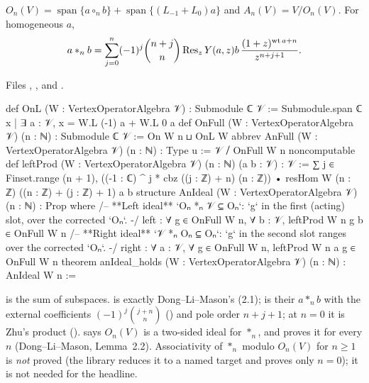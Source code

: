 \begin{definition}\label{l13:def:onfull}
$O_n(V) = \operatorname{span}\{a\circ_nb\} + \operatorname{span}\{(L_{-1}+L_0)a\}$ and $A_n(V) = V/O_n(V)$. For homogeneous $a$,
\begin{equation*}
 a*_nb = \sum_{j=0}^n(-1)^j\binom{n+j}{n}\operatorname{Res}_zY(a,z)b\,\frac{(1+z)^{\operatorname{wt} a+n}}{z^{n+j+1}}.
\end{equation*}
\end{definition}
\noindent Files ,
,
 and
.
\begin{leancode}
def OnL (W : VertexOperatorAlgebra 𝒱) : Submodule ℂ 𝒱 :=
  Submodule.span ℂ {x | ∃ a : 𝒱, x = W.L (-1) a + W.L 0 a}
def OnFull (W : VertexOperatorAlgebra 𝒱) (n : ℕ) : Submodule ℂ 𝒱 :=
  On W n ⊔ OnL W
abbrev AnFull (W : VertexOperatorAlgebra 𝒱) (n : ℕ) : Type u := 𝒱 ⧸ OnFull W n
noncomputable def leftProd (W : VertexOperatorAlgebra 𝒱) (n : ℕ) (a b : 𝒱) : 𝒱 :=
  ∑ j ∈ Finset.range (n + 1),
    ((-1 : ℂ) ^ j * cbz ((j : ℤ) + n) (n : ℤ)) •
      resHom W (n : ℤ) ((n : ℤ) + (j : ℤ) + 1) a b
structure AnIdeal (W : VertexOperatorAlgebra 𝒱) (n : ℕ) : Prop where
  /-- **Left ideal** `Oₙ *ₙ 𝒱 ⊆ Oₙ`: `g` in the first (acting) slot, over the corrected `Oₙ`. -/
  left : ∀ g ∈ OnFull W n, ∀ b : 𝒱, leftProd W n g b ∈ OnFull W n
  /-- **Right ideal** `𝒱 *ₙ Oₙ ⊆ Oₙ`: `g` in the second slot ranges over the corrected `Oₙ`. -/
  right : ∀ a : 𝒱, ∀ g ∈ OnFull W n, leftProd W n a g ∈ OnFull W n
theorem anIdeal_holds (W : VertexOperatorAlgebra 𝒱) (n : ℕ) : AnIdeal W n :=
\end{leancode}

\begin{dictionary}
 is the sum of subspaces.  is exactly Dong--Li--Mason's (2.1);  is their
$a*_nb$ with the external coefficients $(-1)^j\binom{j+n}{n}$ () and pole order $n+j+1$; at
$n = 0$ it is Zhu's product ().  says $O_n(V)$ is a
two-sided ideal for $*_n$, and  proves it for every $n$ (Dong--Li--Mason, Lemma~2.2). Associativity of
$*_n$ modulo $O_n(V)$ for $n\ge1$ is \emph{not} proved (the library reduces it to a named target  and proves
only $n = 0$); it is not needed for the headline.
\end{dictionary}

